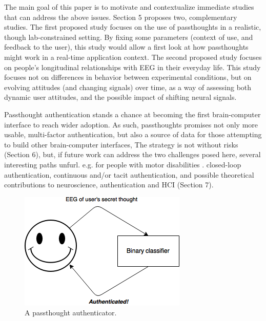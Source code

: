 \documentclass[sigconf]{acmart}
\begin{document}
The main goal of this paper is to motivate and contextualize immediate studies that can address the above issues.
Section 5 proposes two, complementary studies.
The first proposed study focuses on the use of passthoughts in a realistic, though lab-constrained setting.
By fixing some parameters (context of use, and feedback to the user), this study would allow a first look at how passthoughts might work
in a real-time application context.
The second proposed study focuses on people's longitudinal relationships with EEG in their everyday life.
This study focuses not on differences in behavior between experimental conditions, but on evolving attitudes (and changing signals) over time,
as a way of assessing both dynamic user attitudes, and the possible impact of shifting neural signals.

Passthought authentication stands a chance at becoming the first brain-computer interface to reach wider adoption. 
As such, passthoughts promises not only more usable, multi-factor authentication,
but also a source of data for those attempting to build other brain-computer interfaces,
The strategy is not without risks (Section 6),
but, if future work can address the two challenges posed here, several interesting paths unfurl.
e.g. for people with motor disabilities \cite{Mattia2013}.
closed-loop authentication, continuous and/or tacit authentication, 
and possible theoretical contributions to neuroscience, authentication and HCI (Section 7).

\label{fig:earbud}
\begin{figure}[htbp]
\centering
\includegraphics[width=.9\linewidth]{./figures/passthoughts-diagram.png}
\caption{A passthought authenticator.}
\end{figure}
\end{document}
